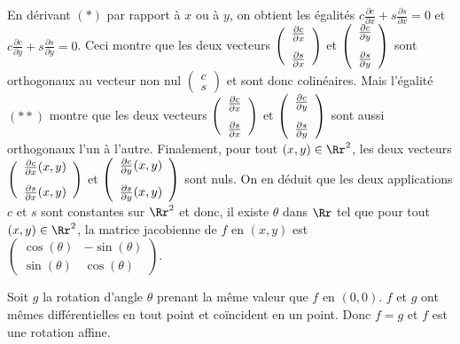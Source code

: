{{En dérivant $(*)$ par rapport à $x$ ou à $y$, on obtient les égalités $c \frac{\partial c}{\partial x}+s \frac{\partial s}{\partial x}=0$ et $c \frac{\partial c}{\partial y}+s \frac{\partial s}{\partial y}=0$. Ceci montre que les deux vecteurs $\left(
\begin{array}{c}
 \frac{\partial c}{\partial x}\\
\rule{0mm}{6mm} \frac{\partial s}{\partial x}
\end{array}
\right)$ et $\left(
\begin{array}{c}
 \frac{\partial c}{\partial y}\\
\rule{0mm}{6mm} \frac{\partial s}{\partial y}
\end{array}
\right)$ sont orthogonaux au vecteur non nul $\left(
\begin{array}{c}
c\\
s
\end{array}
\right)$ et sont donc colinéaires. Mais l'égalité $(**)$ montre que les deux vecteurs $\left(
\begin{array}{c}
 \frac{\partial c}{\partial x}\\
\rule{0mm}{6mm} \frac{\partial s}{\partial x}
\end{array}
\right)$ et $\left(
\begin{array}{c}
 \frac{\partial c}{\partial y}\\
\rule{0mm}{6mm} \frac{\partial s}{\partial y}
\end{array}
\right)$ sont aussi orthogonaux l'un à l'autre. Finalement, pour tout $(x,y)\in\Rr^2$, les deux vecteurs $\left(
\begin{array}{c}
 \frac{\partial c}{\partial x}(x,y)\\
\rule{0mm}{6mm} \frac{\partial s}{\partial x}(x,y)
\end{array}
\right)$ et $\left(
\begin{array}{c}
 \frac{\partial c}{\partial y}(x,y)\\
\rule{0mm}{6mm} \frac{\partial s}{\partial y}(x,y)
\end{array}
\right)$ sont nuls. On en déduit que les deux applications $c$ et $s$ sont constantes sur $\Rr^2$ et donc, il existe $\theta$ dans $\Rr$ tel que pour tout $(x,y)\in\Rr^2$, la matrice jacobienne de $f$ en $(x,y)$ est $\left(
\begin{array}{cc}
\cos(\theta)&-\sin(\theta)\\
\sin(\theta)&\cos(\theta)
\end{array}
\right)$.

Soit $g$ la rotation d'angle $\theta$ prenant la même valeur que $f$ en $(0,0)$. $f$ et $g$ ont mêmes différentielles en tout point et coïncident en un point. Donc $f=g$ et $f$ est une rotation affine.

\begin{center}
\end{center}}
}